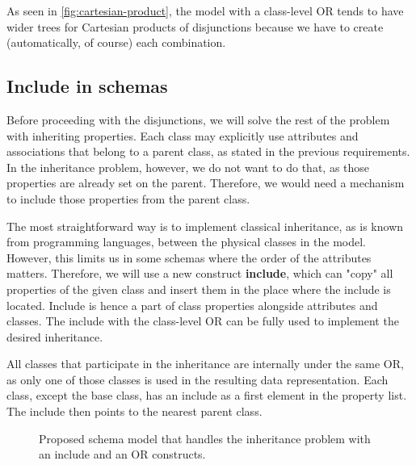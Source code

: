 As seen in \autoref{fig:cartesian-product}, the model with a class-level OR tends to have wider trees for Cartesian products of disjunctions because we have to create (automatically, of course) each combination.

\subsection{Include in schemas}

Before proceeding with the disjunctions, we will solve the rest of the problem with inheriting properties. Each class may explicitly use attributes and associations that belong to a parent class, as stated in the previous requirements. In the inheritance problem, however, we do not want to do that, as those properties are already set on the parent. Therefore, we would need a mechanism to include those properties from the parent class.

The most straightforward way is to implement classical inheritance, as is known from programming languages, between the physical classes in the model. However, this limits us in some schemas where the order of the attributes matters. Therefore, we will use a new construct \textbf{include}, which can "copy" all properties of the given class and insert them in the place where the include is located. Include is hence a part of class properties alongside attributes and classes. The include with the class-level OR can be fully used to implement the desired inheritance.

All classes that participate in the inheritance are internally under the same OR, as only one of those classes is used in the resulting data representation. Each class, except the base class, has an include as a first element in the property list. The include then points to the nearest parent class.

\begin{figure}[h!]\centering
  \centering

    \caption{Proposed schema model that handles the inheritance problem with an include and an OR constructs.}
  \end{figure}

